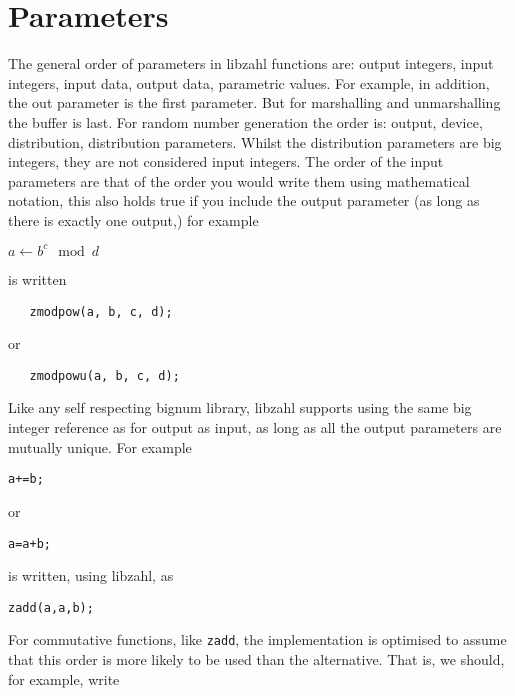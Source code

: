 \newpage
\section{Parameters}
\label{sec:Parameters}

The general order of parameters in libzahl functions
are: output integers, input integers, input data,
output data, parametric values. For example, in
addition, the out parameter is the first parameter.
But for marshalling and unmarshalling the buffer
is last. For random number generation the order is:
output, device, distribution, distribution parameters.
Whilst the distribution parameters are big integers,
they are not considered input integers. The order
of the input parameters are that of the order you
would write them using mathematical notation, this
also holds true if you include the output parameter
(as long as there is exactly one output,) for example

\vspace{1ex}
$a \gets b^c \mod d$
\vspace{1ex}

\noindent
is written

\begin{verbatim}
   zmodpow(a, b, c, d);
\end{verbatim}

\noindent
or

\begin{verbatim}
   zmodpowu(a, b, c, d);
\end{verbatim}

Like any self respecting bignum library, libzahl
supports using the same big integer reference as
for output as input, as long as all the output
parameters are mutually unique. For example

\begin{alltt}
   a += b;
\end{alltt}

\noindent
or

\begin{alltt}
   a = a + b;
\end{alltt}

\noindent
is written, using libzahl, as

\begin{alltt}
   zadd(a, a, b);
\end{alltt}

For commutative functions, like {\tt zadd}, the
implementation is optimised to assume that this
order is more likely to be used than the alternative.
That is, we should, for example, write

